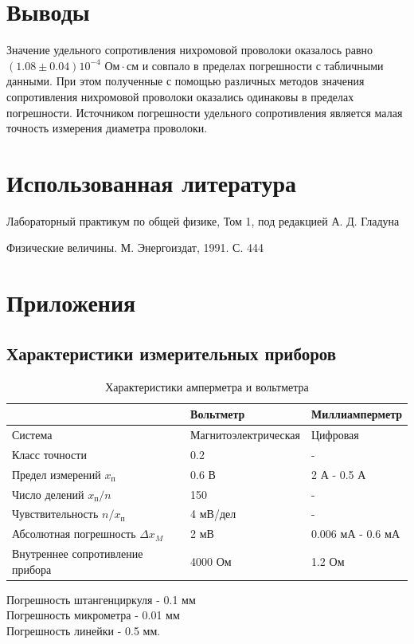 \documentclass{article}
\begin{document}
\section{Выводы}
Значение удельного сопротивления нихромовой проволоки оказалось равно $(1.08 \pm 0.04) 10^{-4}\textrm{ Ом}\cdot\textrm{см}$ и совпало в пределах погрешности
с табличными данными. При этом полученные с помощью различных методов значения сопротивления нихромовой проволоки оказались одинаковы в пределах погрешности.
Источником погрешности удельного сопротивления является малая точность измерения диаметра проволоки.

\section{Использованная литература}
\begin{thebibliography}{9}
    Лабораторный практикум по общей физике, Том 1, под редакцией А. Д. Гладуна
    
    Физические величины. М. Энергоиздат, 1991. С. 444
    \end{thebibliography}

\section{Приложения}
\subsection{Характеристики измерительных приборов} \label{sec:app_1}
\begin{table}[H]
    \begin{tabular}{|l|l|l|}
        \hline
                                            & Вольтметр            & Миллиамперметр    \\
        \hline
        Система                             & Магнитоэлектрическая & Цифровая          \\
        Класс точности                      & 0.2                  & -                 \\
        Предел измерений $x_\textrm{п}$     & 0.6 В                & 2 А - 0.5 А       \\
        Число делений $x_\textrm{п}/n$      & 150                  & -                 \\
        Чувствительность $n/x_\textrm{п}$   & 4 мВ/дел             & -                 \\
        Абсолютная погрешность $\Delta x_M$ & 2 мВ                 & 0.006 мА - 0.6 мА \\
        Внутреннее сопротивление прибора    & 4000 Ом              & 1.2 Ом            \\
        \hline
    \end{tabular}
    \caption{Характеристики амперметра и вольтметра}
    \label{tab:1}
\end{table}
Погрешность штангенциркуля - 0.1 мм\\
Погрешность микрометра - 0.01 мм\\
Погрешность линейки - 0.5 мм.
\end{document}
